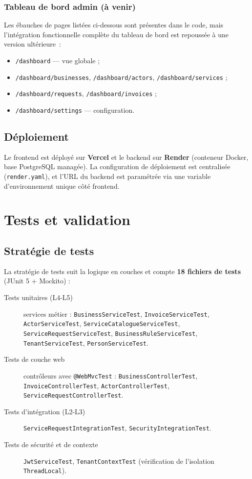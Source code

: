 \documentclass[12pt,a4paper]{report}
\theoremstyle{definition}
\theoremstyle{remark}
\begin{document}
\subsection{Tableau de bord admin (à venir)}
Les ébauches de pages listées ci-dessous sont présentes dans le code, mais l'intégration fonctionnelle complète du tableau de bord est repoussée à une version ultérieure~:
\begin{itemize}
	\item \texttt{/dashboard} — vue globale ;
	\item \texttt{/dashboard/businesses}, \texttt{/dashboard/actors}, \texttt{/dashboard/services} ;
	\item \texttt{/dashboard/requests}, \texttt{/dashboard/invoices} ;
	\item \texttt{/dashboard/settings} — configuration.
\end{itemize}

\section{Déploiement}
Le frontend est déployé sur \textbf{Vercel} et le backend sur \textbf{Render} (conteneur Docker, base PostgreSQL managée). La configuration de déploiement est centralisée (\texttt{render.yaml}), et l'URL du backend est paramétrée via une variable d'environnement unique côté frontend.

\chapter{Tests et validation}
\label{chap:tests}

\section{Stratégie de tests}

La stratégie de tests suit la logique en couches et compte \textbf{18 fichiers de tests} (JUnit 5 + Mockito) :
\begin{description}
	\item[Tests unitaires (L4-L5)] services métier : \texttt{BusinessServiceTest}, \texttt{InvoiceServiceTest}, \texttt{ActorServiceTest}, \texttt{ServiceCatalogueServiceTest}, \texttt{ServiceRequestServiceTest}, \texttt{BusinessRuleServiceTest}, \texttt{TenantServiceTest}, \texttt{PersonServiceTest}.
	\item[Tests de couche web] contrôleurs avec \texttt{@WebMvcTest} : \texttt{BusinessControllerTest}, \texttt{InvoiceControllerTest}, \texttt{ActorControllerTest}, \texttt{ServiceRequestControllerTest}.
	\item[Tests d'intégration (L2-L3)] \texttt{ServiceRequestIntegrationTest}, \texttt{SecurityIntegrationTest}.
	\item[Tests de sécurité et de contexte] \texttt{JwtServiceTest}, \texttt{TenantContextTest} (vérification de l'isolation \texttt{ThreadLocal}).
\end{description}
\end{document}
